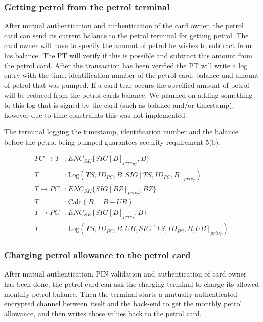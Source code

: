 \subsubsection{Getting petrol from the petrol terminal}
After mutual authentication and authentication of the card owner, the petrol card can send its current balance to the petrol terminal for getting petrol. The card owner will have to specify the amount of petrol he wishes to subtract from his balance. The PT will verify if this is possible and subtract this amount from the petrol card. After the transaction has been verified the PT will write a log entry with the time, identification number of the petrol card, balance and amount of  petrol that was pumped. If a card tear occurs the specified amount of petrol will be reduced from the petrol cards balance. We planned on adding something to this log that is signed by the card (such as balance and/or timestamp), however due to time constraints this was not implemented.  %

The terminal logging the timestamp, identification number and the balance before the petrol being pumped guarantees security requirement 5(b).

\begin{equation}\nonumber
\begin{split}
PC \to T&: ENC_{SK}\{SIG[B]_{priv_{PC}}, B\}\\
T&: \text{Log}(TS, ID_{PC}, B, SIG[TS, ID_{PC}, B]_{priv_T}) \\
T \to PC&: ENC_{SK}\{SIG[BZ]_{priv_T}, BZ\}\\
T&: \text{Calc}(B = B - UB)\\
T \to PC&: ENC_{SK}\{SIG[B]_{priv_T}, B\}\\
T&: \text{Log}(TS, ID_{PC}, B, UB, SIG[TS, ID_{PC}, B, UB]_{priv_T})
\end{split} 
\end{equation}


\subsubsection{Charging petrol allowance to the petrol card}
After mutual authentication, PIN validation and authentication of card owner
has been done, the petrol card can ask the charging terminal to charge its
allowed monthly petrol balance. Then the terminal starts a mutually
authenticated encrypted channel between itself and the back-end to get the monthly petrol allowance, and then
writes those values back to the petrol card.\\

